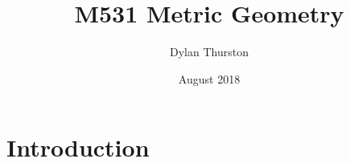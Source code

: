 \documentclass{article}
\title{M531 Metric Geometry}
\author{Dylan Thurston}
\date{August 2018}
\begin{document}
\maketitle

\section{Introduction}
\end{document}

